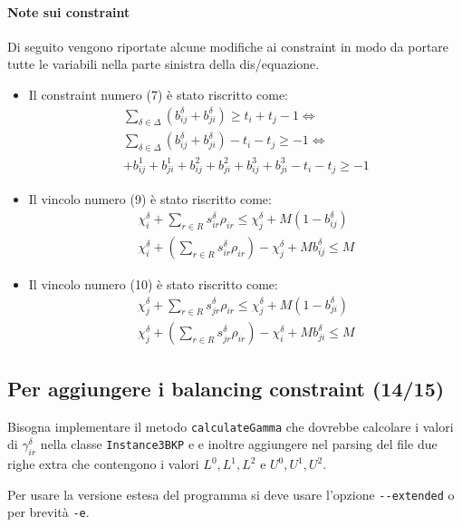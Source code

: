 \documentclass{scrartcl}
\begin{document}
\paragraph{Note sui constraint}
Di seguito vengono riportate alcune modifiche ai constraint in modo da portare
tutte le variabili nella parte sinistra della dis/equazione.
\begin{itemize}
	\item 
	Il constraint numero (7) è stato riscritto come:
	$$
	\begin{array}{l}
	\sum_{\delta \in \Delta}(b_{ij}^\delta + b_{ji}^\delta) \geq t_i + t_j - 1 \iff \\
	\sum_{\delta \in \Delta}(b_{ij}^\delta + b_{ji}^\delta) - t_i - t_j \geq - 1 \iff \\
	+ b_{ij}^1 + b_{ji}^1 + b_{ij}^2 + b_{ji}^2 + b_{ij}^3 + b_{ji}^3 - t_i - t_j \geq  -1
	\end{array}
	$$
	\item 
	Il vincolo numero (9) è stato riscritto come:
	$$
	\begin{array}{l}
	\chi_i^\delta + \sum_{r \in R} s_{ir}^\delta \rho_{ir} \leq \chi_j^\delta + M(1 - b_{ij}^\delta)\\
	\chi_i^\delta + (\sum_{r \in R} s_{ir}^\delta \rho_{ir}) -  \chi_j^\delta + M b_{ij}^\delta \leq M
	\end{array}
	$$
	\item 
	Il vincolo numero (10) è stato riscritto come:
	$$
	\begin{array}{l}
	\chi_j^\delta + \sum_{r \in R} s_{jr}^\delta \rho_{ir} \leq \chi_j^\delta + M(1 - b_{ji}^\delta)\\
	\chi_j^\delta + (\sum_{r \in R} s_{jr}^\delta \rho_{ir}) -  \chi_i^\delta + M b_{ji}^\delta \leq M
	\end{array}
	$$
\end{itemize}

\subsection{Per aggiungere i balancing constraint (14/15)}
Bisogna implementare il metodo \verb|calculateGamma| che dovrebbe calcolare i valori di $\gamma_{ir}^\delta$ nella classe \verb|Instance3BKP| e  
e inoltre aggiungere nel parsing del file due righe extra che contengono i valori
$L^0, L^1, L^2$ e $U^0, U^1, U^2$.

Per usare la versione estesa del programma si deve usare l'opzione \verb|--extended| o per brevità \verb|-e|.
\end{document}
